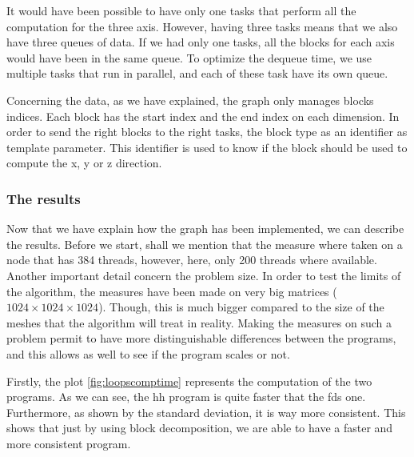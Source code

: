 It would have been possible to have only one tasks that perform all the
computation for the three axis. However, having three tasks means that we also
have three queues of data. If we had only one tasks, all the blocks for each
axis would have been in the same queue. To optimize the dequeue time, we use
multiple tasks that run in parallel, and each of these task have its own queue.

Concerning the data, as we have explained, the graph only manages blocks
indices. Each block has the start index and the end index on each dimension. In
order to send the right blocks to the right tasks, the block type as an
identifier as template parameter. This identifier is used to know if the block
should be used to compute the x, y or z direction.

\clearpage{}
\subsubsection{The results}

Now that we have explain how the graph has been implemented, we can describe the
results. Before we start, shall we mention that the measure where taken on a
node that has 384 threads, however, here, only 200 threads where available.
Another important detail concern the problem size. In order to test the limits
of the algorithm, the measures have been made on very big matrices
($1024\times1024\times1024$). Though, this is much bigger compared to the size
of the meshes that the algorithm will treat in reality. Making the measures on
such a problem permit to have more distinguishable differences between the
programs, and this allows as well to see if the program scales or not.

Firstly, the plot \ref{fig:loopscomptime} represents the computation of the two
programs. As we can see, the \gls{hh} program is quite faster that the
\gls{fds} one. Furthermore, as shown by the standard deviation, it is way more
consistent. This shows that just by using block decomposition, we are able to
have a faster and more consistent program.

